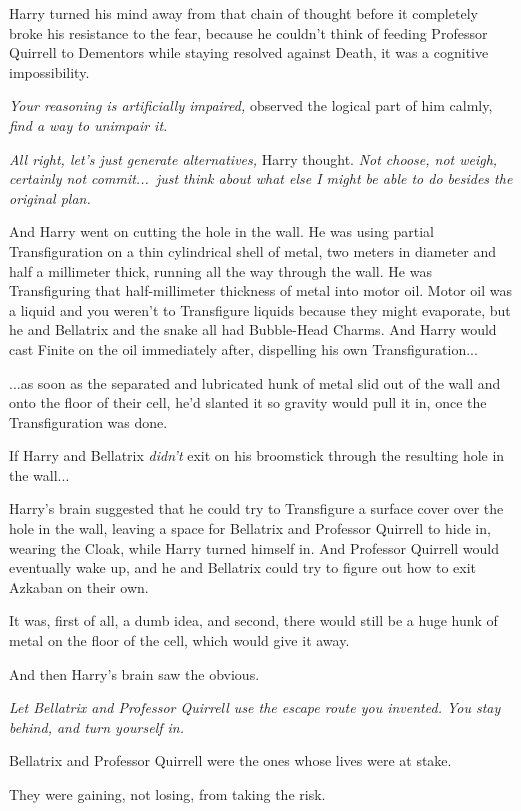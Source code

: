 Harry turned his mind away from that chain of thought before it completely broke his resistance to the fear, because he couldn’t think of feeding Professor Quirrell to Dementors while staying resolved against Death, it was a cognitive impossibility.

\emph{Your reasoning is artificially impaired,} observed the logical part of him calmly, \emph{find a way to unimpair it.}

\emph{All right, let’s just generate alternatives,} Harry thought.\emph{ Not choose, not weigh, certainly not commit...\ just think about what else I might be able to do besides the original plan.}

And Harry went on cutting the hole in the wall. He was using partial Transfiguration on a thin cylindrical shell of metal, two meters in diameter and half a millimeter thick, running all the way through the wall. He was Transfiguring that half-millimeter thickness of metal into motor oil. Motor oil was a liquid and you weren’t to Transfigure liquids because they might evaporate, but he and Bellatrix and the snake all had Bubble-Head Charms. And Harry would cast Finite on the oil immediately after, dispelling his own Transfiguration...

...as soon as the separated and lubricated hunk of metal slid out of the wall and onto the floor of their cell, he’d slanted it so gravity would pull it in, once the Transfiguration was done.

If Harry and Bellatrix \emph{didn’t} exit on his broomstick through the resulting hole in the wall...

Harry’s brain suggested that he could try to Transfigure a surface cover over the hole in the wall, leaving a space for Bellatrix and Professor Quirrell to hide in, wearing the Cloak, while Harry turned himself in. And Professor Quirrell would eventually wake up, and he and Bellatrix could try to figure out how to exit Azkaban on their own.

It was, first of all, a dumb idea, and second, there would still be a huge hunk of metal on the floor of the cell, which would give it away.

And then Harry’s brain saw the obvious.

\emph{Let Bellatrix and Professor Quirrell use the escape route you invented. You stay behind, and turn yourself in.}

Bellatrix and Professor Quirrell were the ones whose lives were at stake.

They were gaining, not losing, from taking the risk.

